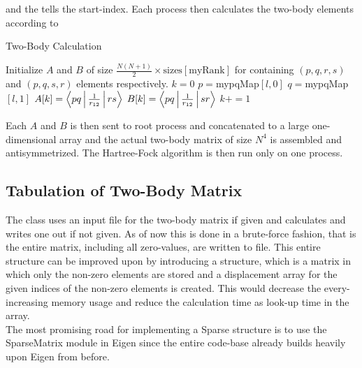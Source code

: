     and the  tells the start-index. Each process then
    calculates the two-body elements according to
        \begin{algorithm}[H]
            \caption{Two-Body Calculation}\label{alg:paratwobody}
            \begin{algorithmic}[H]
                \State Initialize $A$ and $B$ of size
                $\frac{N(N+1)}{2}\times\text{sizes}[\text{myRank}]$ for
                containing $(p,q,r,s)$ and $(p,q,s,r)$ elements respectively.
                \State $k=0$
                    \State $p=$mypqMap$[l,0]$
                    \State $q=$mypqMap$[l,1]$
                            \State $A[k]=\Braket{pq|\frac{1}{r_{12}}|rs}$
                            \State $B[k]=\Braket{pq|\frac{1}{r_{12}}|sr}$
                            \State $k += 1$
                        \EndFor
                    \EndFor
                \EndFor
            \end{algorithmic}
        \end{algorithm}
    Each $A$ and $B$ is then sent to root process and concatenated to a large
    one-dimensional array and the actual two-body matrix of size $N^4$ is
    assembled and antisymmetrized. The Hartree-Fock algorithm is then run only
    on one process.

\subsection{Tabulation of Two-Body Matrix}
    The  class uses an input file for the two-body
    matrix if given and calculates  and writes one out if not given. As of now
    this is done in a brute-force fashion, that is the entire matrix, including
    all zero-values, are written to file. This entire structure can be improved
    upon by introducing a  structure, which is a matrix in
    which only the non-zero elements are stored and a displacement array for
    the given indices of the non-zero elements is created. This would decrease
    the every-increasing memory usage and reduce the calculation time as
    look-up time in the array. \\
    The most promising road for implementing a Sparse structure is to use the
    SparseMatrix module in Eigen since the entire code-base already builds
    heavily upon Eigen from before.


